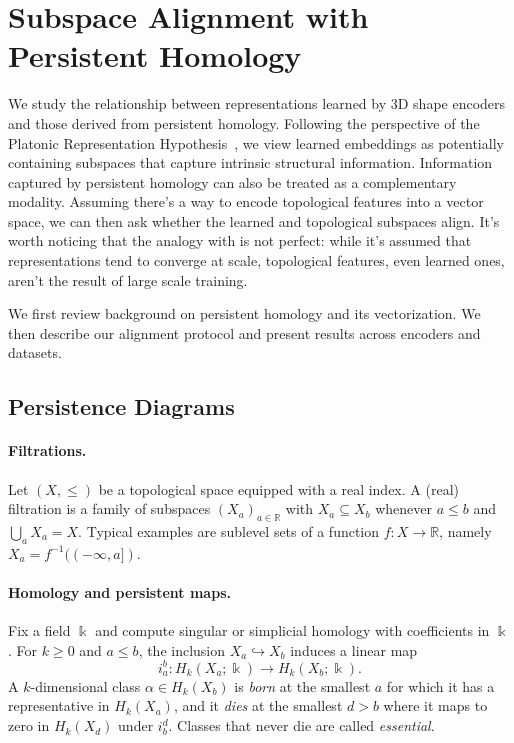 \section{Subspace Alignment with Persistent Homology}
\label{sec:ph}

We study the relationship between representations learned by 3D shape encoders and those derived from persistent homology. Following the perspective of the Platonic Representation Hypothesis~\cite{plato,platonic}, we view learned embeddings as potentially containing subspaces that capture intrinsic structural information. Information captured by persistent homology can also be treated as a complementary modality. Assuming there's a way to encode topological features into a vector space, we can then ask whether the learned and topological subspaces align. It's worth noticing that the analogy with \cite{platonic} is not perfect: while it's assumed that representations tend to converge at scale, topological features, even learned ones, aren't the result of large scale training.

We first review background on persistent homology and its vectorization. We then describe our alignment protocol and present results across encoders and datasets.


\subsection{Persistence Diagrams}
\label{ssec:persistence_diagrams}


\paragraph{Filtrations.}
Let $(X, \leq)$ be a topological space equipped with a real index. A (real) filtration is a family of subspaces $(X_a)_{a\in\mathbb{R}}$ with $X_a \subseteq X_b$ whenever $a \leq b$ and $\bigcup_a X_a = X$. Typical examples are sublevel sets of a function $f:X\to\mathbb{R}$, namely $X_a = f^{-1}((-\infty,a])$.

\paragraph{Homology and persistent maps.}
Fix a field $\Bbbk$ and compute singular or simplicial homology with coefficients in $\Bbbk$. For $k\ge 0$ and $a\le b$, the inclusion $X_a \hookrightarrow X_b$ induces a linear map
\begin{equation}
i_{a}^{b}: H_k(X_a;\Bbbk) \longrightarrow H_k(X_b;\Bbbk).
\end{equation}
A $k$-dimensional class $\alpha\in H_k(X_b)$ is \emph{born} at the smallest $a$ for which it has a representative in $H_k(X_a)$, and it \emph{dies} at the smallest $d>b$ where it maps to zero in $H_k(X_d)$ under $i_{b}^{d}$. Classes that never die are called \emph{essential}.

